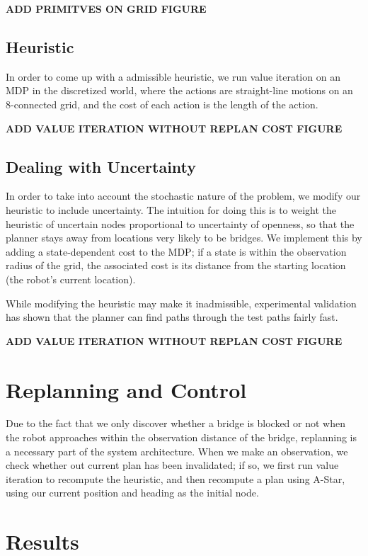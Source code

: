\documentclass{article}
\begin{document}
\textbf{ADD PRIMITVES ON GRID FIGURE}

\subsection{Heuristic}

In order to come up with a admissible heuristic, we run value iteration on an MDP in the discretized world, where the actions are straight-line motions on an 8-connected grid, and the cost of each action is the length of the action. 

\textbf{ADD VALUE ITERATION WITHOUT REPLAN COST FIGURE}

\subsection{Dealing with Uncertainty}

In order to take into account the stochastic nature of the problem, we modify our heuristic to include uncertainty. The intuition for doing this is to weight the heuristic of uncertain nodes proportional to uncertainty of openness, so that the planner stays away from locations very likely to be bridges. We implement this by adding a state-dependent cost to the MDP; if a state is within the observation radius of the grid, the associated cost is its distance from the starting location (the robot's current location).

While modifying the heuristic may make it inadmissible, experimental validation has shown that the planner can find paths through the test paths fairly fast.

\textbf{ADD VALUE ITERATION WITHOUT REPLAN COST FIGURE}

\section{Replanning and Control}

Due to the fact that we only discover whether a bridge is blocked or not when the robot approaches within the observation distance of the bridge, replanning is a necessary part of the system architecture. When we make an observation, we check whether out current plan has been invalidated; if so, we first run value iteration to recompute the heuristic, and then recompute a plan using A-Star, using our current position and heading as the initial node.

\section{Results}
\end{document}
